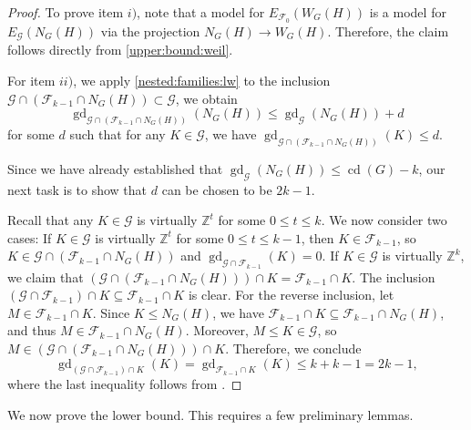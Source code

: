 \documentclass[a4paper,12pt,leqno]{amsart}
\theoremstyle{definition}
\newcommand{\calF}{{\mathcal F}}
\newcommand{\calG}{{\mathcal G}}
\DeclareMathOperator{\cd}{cd}
\DeclareMathOperator{\gd}{gd}
\begin{document}
\begin{proof}
To prove item \( i) \), note that a model for \( E_{\calF_0}(W_G(H)) \) is a model for \( E_{\calG}(N_G(H)) \) via the projection \( N_G(H) \to W_G(H) \). Therefore, the claim follows directly from \cref{upper:bound:weil}.

For item \( ii) \), we apply \cref{nested:families:lw} to the inclusion \( \calG \cap (\calF_{k-1}\cap N_G(H)) \subset \calG \), we obtain
\[
\gd_{\calG \cap (\calF_{k-1}\cap N_G(H))}(N_G(H)) \leq \gd_{\calG}(N_G(H)) + d
\]
for some \( d \) such that for any \( K \in \calG \), we have \( \gd_{\calG \cap (\calF_{k-1}\cap N_G(H))}(K) \leq d \).

Since we have already established that \( \gd_{\calG}(N_G(H)) \leq \cd(G) - k \), our next task is to show that \( d \) can be chosen to be \( 2k - 1 \).

Recall that any \( K \in \calG \) is virtually \( \mathbb{Z}^t \) for some \( 0 \leq t \leq k \). We now consider two cases: If \( K \in \calG \) is virtually \( \mathbb{Z}^t \) for some \( 0 \leq t \leq k-1 \), then \( K \in \calF_{k-1} \), so \( K \in \calG \cap (\calF_{k-1}\cap N_G(H)) \) and \( \gd_{\calG \cap \calF_{k-1}}(K) = 0 \).
 If \( K \in \calG \) is virtually \( \mathbb{Z}^k \), we claim that \( (\calG \cap (\calF_{k-1}\cap N_G(H))) \cap K = \calF_{k-1} \cap K \). The inclusion \( (\calG \cap \calF_{k-1}) \cap K \subseteq \calF_{k-1} \cap K \) is clear. For the reverse inclusion, let \( M \in \calF_{k-1} \cap K \). Since \( K \leq N_G(H)\), we have \( \calF_{k-1} \cap K \subseteq \calF_{k-1} \cap N_G(H)\), and thus \( M \in \calF_{k-1} \cap N_G(H) \). Moreover, \( M \leq K \in \calG \), so \( M \in (\calG \cap (\calF_{k-1}\cap N_G(H))) \cap K \). Therefore, we conclude
\[
\gd_{(\calG \cap \calF_{k-1}) \cap K}(K) = \gd_{\calF_{k-1} \cap K}(K) \leq k + k - 1 = 2k - 1,
\]
where the last inequality follows from \cite[Proposition 1.3]{tomasz}.
\end{proof}
We now prove the lower bound. This requires a few preliminary lemmas.
\end{document}

